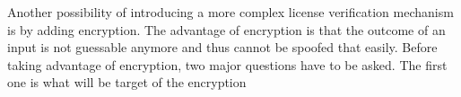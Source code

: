 Another possibility of introducing a more complex license verification mechanism is by adding encryption.
The advantage of encryption is that the outcome of an input is not guessable anymore and thus cannot be spoofed that easily.
Before taking advantage of encryption, two major questions have to be asked.
The first one is what will be target of the encryption

